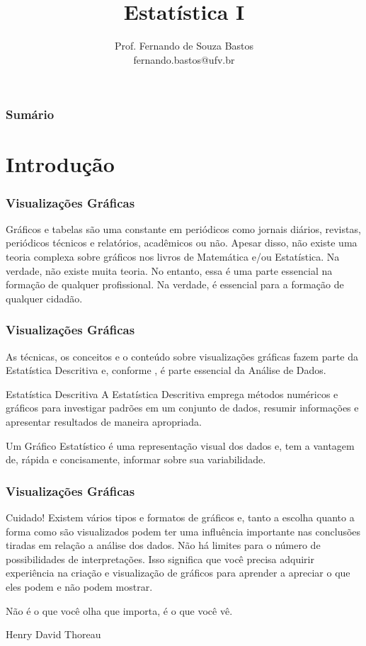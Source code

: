 \documentclass[14pt,aspectratio=1610]{beamer}
\title{Estatística I}
\author{Prof. Fernando de Souza Bastos \texorpdfstring{\\ fernando.bastos@ufv.br}{}}
\institute{Departamento de Estatística\texorpdfstring{\\ Universidade Federal de Viçosa}{}\texorpdfstring{\\ Campus UFV - Viçosa}{}}
\date{}
\begin{document}
%

\frame{\titlepage}

\begin{frame}{}
\frametitle{\bf Sumário}
\tableofcontents
\end{frame}

\section{Introdução}
\begin{frame}{}
\frametitle{Visualizações Gráficas}
\begin{block}{}
\justifying
Gráficos e tabelas são uma constante em periódicos como jornais diários, revistas, periódicos técnicos e relatórios, acadêmicos ou não. Apesar disso, não existe uma teoria complexa sobre gráficos nos livros de Matemática e/ou Estatística. Na verdade, não existe muita teoria. No entanto, essa é uma parte essencial na formação de qualquer profissional. Na verdade, é essencial para a formação de qualquer cidadão.
\end{block}
\end{frame}

\begin{frame}{}
\frametitle{Visualizações Gráficas}
\begin{block}{}
\justifying
As técnicas, os conceitos e o conteúdo sobre visualizações gráficas fazem parte da Estatística Descritiva e, conforme \cite{unwin}, é parte essencial da Análise de Dados.
\end{block}
\pause
\begin{block}{Estatística Descritiva}
\justifying
A Estatística Descritiva emprega métodos numéricos e gráficos para investigar padrões em um conjunto de dados, resumir informações e apresentar resultados de maneira apropriada. 
\end{block}
\pause
\begin{block}{}
\justifying
Um Gráfico Estatístico é uma representação visual dos dados e, tem a vantagem de, rápida e concisamente, informar sobre sua variabilidade. 
\end{block}
\end{frame}

\begin{frame}{}
\frametitle{Visualizações Gráficas}
\begin{block}{Cuidado!}
\justifying
Existem vários tipos e formatos de gráficos e, tanto a escolha quanto a forma como são visualizados podem ter uma influência importante nas conclusões tiradas em relação a análise dos dados. Não há limites para o número de possibilidades de interpretações. Isso significa que você precisa adquirir ex\-pe\-ri\-ên\-cia na criação e visualização de gráficos para aprender a apreciar o que eles podem e não podem mostrar.
\end{block}
\pause
\begin{block}{}
\justifying
Não é o que você olha que importa, é o que você vê.
\begin{flushright}
Henry David Thoreau
\end{flushright}
\end{block}
\end{frame}
\end{document}
